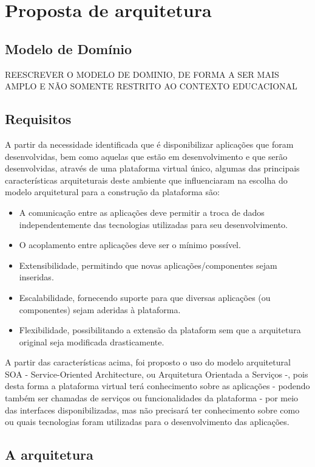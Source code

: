 \section{Proposta de arquitetura}

\subsection{Modelo de Domínio}

{REESCREVER O MODELO DE DOMINIO, DE FORMA A SER MAIS AMPLO E NÃO SOMENTE RESTRITO AO CONTEXTO EDUCACIONAL}

\subsection{Requisitos}
A partir da necessidade identificada que é disponibilizar aplicações que foram desenvolvidas, bem como aquelas que estão em desenvolvimento e que serão desenvolvidas, através de uma plataforma virtual único, algumas das principais características arquiteturais deste ambiente que influenciaram na escolha do modelo arquitetural para a construção da plataforma são:

\begin{itemize}
\item A comunicação entre as aplicações deve permitir a troca de dados independentemente das tecnologias utilizadas para seu desenvolvimento.
\item O acoplamento entre aplicações deve ser o mínimo possível.
\item Extensibilidade, permitindo que novas aplicações/componentes sejam inseridas.
\item Escalabilidade, fornecendo suporte para que diversas aplicações (ou componentes) sejam aderidas à plataforma.
\item Flexibilidade,  possibilitando a extensão da plataform sem que a arquitetura original seja modificada drasticamente.
\end{itemize}

A partir das características acima, foi proposto o uso do modelo arquitetural SOA - Service-Oriented Architecture, ou Arquitetura Orientada a Serviços -, pois desta forma a plataforma virtual terá conhecimento sobre as aplicações - podendo também ser chamadas de serviços ou funcionalidades da plataforma - por meio das interfaces disponibilizadas, mas não precisará ter conhecimento sobre como ou quais tecnologias foram utilizadas para o desenvolvimento das aplicações.

\subsection{A arquitetura}

